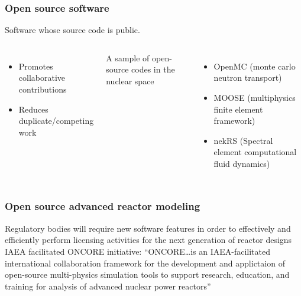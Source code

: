 \begin{frame}
    \frametitle{Open source software}
    Software whose source code is public.
    
    \begin{columns}
        \column[t]{5cm}
        \begin{itemize}
            \item Promotes collaborative contributions
            \item Reduces duplicate/competing work
        \end{itemize}

        \pause
        \column[t]{5cm}
        A sample of open-source codes in the nuclear space
        \begin{itemize}
            \item OpenMC (monte carlo neutron transport)
            \item MOOSE (multiphysics finite element framework)
            \item nekRS (Spectral element computational fluid dynamics)
        \end{itemize}
    \end{columns}
\end{frame}

\begin{frame}
    \frametitle{Open source advanced reactor modeling}
    Regulatory bodies will require new software features in order to effectively and efficiently perform licensing activities for the next generation of reactor designs\cite{usnrc_nonlwr_2020-1}
    \pause
    \newline
    \newline
    \Gls{IAEA} facilitated \Gls{ONCORE} initiative\cite{fiorina_initiative_2021}:
    \newline
    \newline
    \noindent ``ONCORE\ldots is an IAEA-facilitated international collaboration framework for the development and applictaion of open-source multi-physics simulation tools to support research, education, and training for analysis of advanced nuclear power reactors''\cite{iaea_open-source}
\end{frame}

